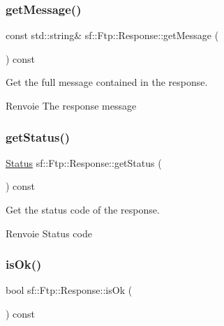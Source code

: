\subsubsection{\texorpdfstring{get\+Message()}{getMessage()}}
{\footnotesize\ttfamily const std\+::string\& sf\+::\+Ftp\+::\+Response\+::get\+Message (\begin{DoxyParamCaption}{ }\end{DoxyParamCaption}) const}



Get the full message contained in the response. 

\begin{DoxyReturn}{Renvoie}
The response message 
\end{DoxyReturn}
\mbox{\label{classsf_1_1Ftp_1_1Response_a52bbca9fbf5451157bc055e3d8430c25}} 
\subsubsection{\texorpdfstring{get\+Status()}{getStatus()}}
{\footnotesize\ttfamily \hyperlink{classsf_1_1Ftp_1_1Response_af81738f06b6f571761696291276acb3b}{Status} sf\+::\+Ftp\+::\+Response\+::get\+Status (\begin{DoxyParamCaption}{ }\end{DoxyParamCaption}) const}



Get the status code of the response. 

\begin{DoxyReturn}{Renvoie}
Status code 
\end{DoxyReturn}
\mbox{\label{classsf_1_1Ftp_1_1Response_a5102552955a2652c1a39e9046e617b36}} 
\subsubsection{\texorpdfstring{is\+Ok()}{isOk()}}
{\footnotesize\ttfamily bool sf\+::\+Ftp\+::\+Response\+::is\+Ok (\begin{DoxyParamCaption}{ }\end{DoxyParamCaption}) const}



